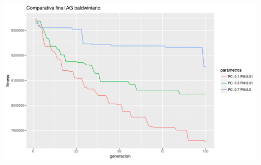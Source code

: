 \documentclass[10pt,a4paper]{article}
\begin{document}
\includegraphics[width = \textwidth]{img/graphics/GAbaldwinFinal.pdf}
\end{document}
